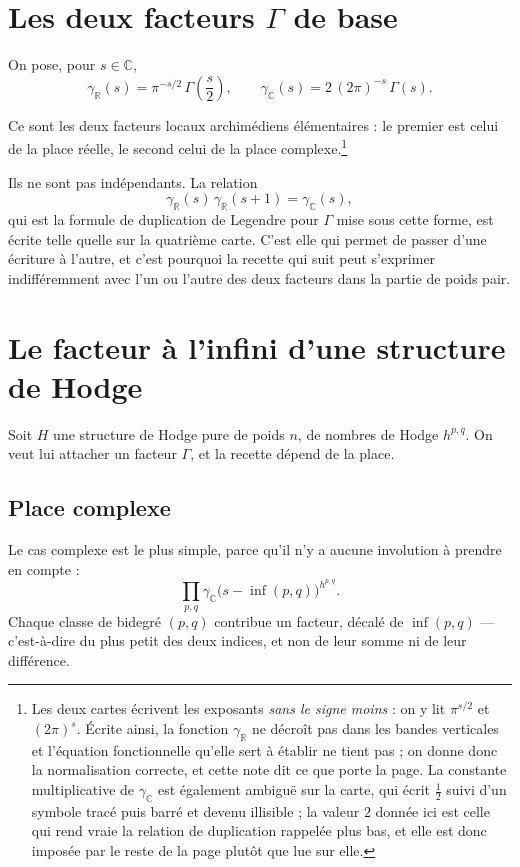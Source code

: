 \documentclass[11pt,a4paper]{article}
\begin{document}
\section*{Les deux facteurs $\Gamma$ de base}

On pose, pour $s \in \mathbb{C}$,
\[
\gamma_{\mathbb{R}}(s) = \pi^{-s/2}\,\Gamma\!\left(\frac{s}{2}\right),
\qquad
\gamma_{\mathbb{C}}(s) = 2\,(2\pi)^{-s}\,\Gamma(s).
\]

Ce sont les deux facteurs locaux archimédiens élémentaires : le premier est
celui de la place réelle, le second celui de la place complexe.\footnote{Les
deux cartes écrivent les exposants \emph{sans le signe moins} : on y lit
$\pi^{s/2}$ et $(2\pi)^{s}$. Écrite ainsi, la fonction $\gamma_{\mathbb{R}}$ ne
décroît pas dans les bandes verticales et l'équation fonctionnelle qu'elle sert
à établir ne tient pas ; on donne donc la normalisation correcte, et cette note
dit ce que porte la page. La constante multiplicative de $\gamma_{\mathbb{C}}$
est également ambiguë sur la carte, qui écrit $\tfrac{1}{2}$ suivi d'un symbole
tracé puis barré et devenu illisible ; la valeur $2$ donnée ici est celle qui
rend vraie la relation de duplication rappelée plus bas, et elle est donc
imposée par le reste de la page plutôt que lue sur elle.}

Ils ne sont pas indépendants. La relation
\[
\gamma_{\mathbb{R}}(s)\,\gamma_{\mathbb{R}}(s+1) = \gamma_{\mathbb{C}}(s),
\]
qui est la formule de duplication de Legendre pour $\Gamma$ mise sous cette
forme, est écrite telle quelle sur la quatrième carte. C'est elle qui permet de
passer d'une écriture à l'autre, et c'est pourquoi la recette qui suit peut
s'exprimer indifféremment avec l'un ou l'autre des deux facteurs dans la partie
de poids pair.

\section*{Le facteur à l'infini d'une structure de Hodge}

Soit $H$ une structure de Hodge pure de poids $n$, de nombres de Hodge
$h^{p,q}$. On veut lui attacher un facteur $\Gamma$, et la recette dépend de la
place.

\subsection*{Place complexe}

Le cas complexe est le plus simple, parce qu'il n'y a aucune involution à
prendre en compte :
\[
\prod_{p,q} \gamma_{\mathbb{C}}\bigl(s - \inf(p,q)\bigr)^{h^{p,q}}.
\]
Chaque classe de bidegré $(p,q)$ contribue un facteur, décalé de
$\inf(p,q)$ --- c'est-à-dire du plus petit des deux indices, et non de leur
somme ni de leur différence.
\end{document}
